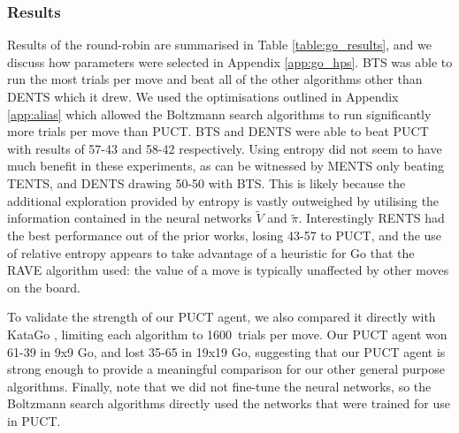 \documentclass{article}
\newcommand{\cl}[1]{\mathcal{#1}}
\theoremstyle{plain}
\begin{document}
        \subsubsection{Results}
            Results of the round-robin are summarised in Table \ref{table:go_results}, and we discuss how parameters were selected in Appendix \ref{app:go_hps}. BTS was able to run the most trials per move and beat all of the other algorithms other than DENTS which it drew. We used the optimisations outlined in Appendix \ref{app:alias} which allowed the Boltzmann search algorithms to run significantly more trials per move than PUCT. 
            BTS and DENTS were able to beat PUCT with results of 57-43 and 58-42 respectively. Using entropy did not seem to have much benefit in these experiments, as can be witnessed by MENTS only beating TENTS, and DENTS drawing 50-50 with BTS. This is likely because the additional exploration provided by entropy is vastly outweighed by utilising the information contained in the neural networks $\tilde{V}$ and $\tilde{\pi}$. %
            Interestingly RENTS had the best performance out of the prior works, losing 43-57 to PUCT, and the use of relative entropy appears to take advantage of a heuristic for Go that the RAVE \cite{rave} algorithm used: the value of a move is typically unaffected by other moves on the board.
            
            To validate the strength of our PUCT agent, we also compared it directly with KataGo \cite{katago}, limiting each algorithm to 1600~trials per move. Our PUCT agent won 61-39 in 9x9 Go, and lost 35-65 in 19x19 Go, suggesting that our PUCT agent is strong enough to provide a meaningful comparison for our other general purpose algorithms. Finally, note that we did not fine-tune the neural networks, so the Boltzmann search algorithms directly used the networks that were trained for use in PUCT.
            
\end{document}

